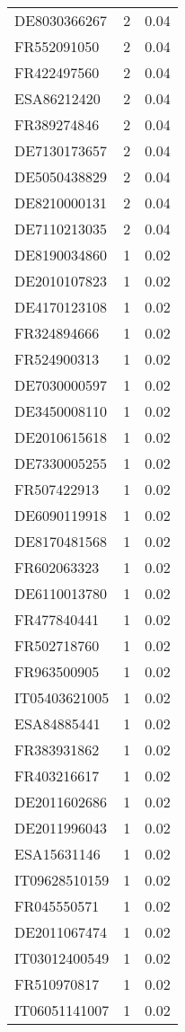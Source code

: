 \begin{table*}[htbp]
\begin{tabular}{lrr}
DE8030366267 & 2 & 0.04 \\
FR552091050 & 2 & 0.04 \\
FR422497560 & 2 & 0.04 \\
ESA86212420 & 2 & 0.04 \\
FR389274846 & 2 & 0.04 \\
DE7130173657 & 2 & 0.04 \\
DE5050438829 & 2 & 0.04 \\
DE8210000131 & 2 & 0.04 \\
DE7110213035 & 2 & 0.04 \\
DE8190034860 & 1 & 0.02 \\
DE2010107823 & 1 & 0.02 \\
DE4170123108 & 1 & 0.02 \\
FR324894666 & 1 & 0.02 \\
FR524900313 & 1 & 0.02 \\
DE7030000597 & 1 & 0.02 \\
DE3450008110 & 1 & 0.02 \\
DE2010615618 & 1 & 0.02 \\
DE7330005255 & 1 & 0.02 \\
FR507422913 & 1 & 0.02 \\
DE6090119918 & 1 & 0.02 \\
DE8170481568 & 1 & 0.02 \\
FR602063323 & 1 & 0.02 \\
DE6110013780 & 1 & 0.02 \\
FR477840441 & 1 & 0.02 \\
FR502718760 & 1 & 0.02 \\
FR963500905 & 1 & 0.02 \\
IT05403621005 & 1 & 0.02 \\
ESA84885441 & 1 & 0.02 \\
FR383931862 & 1 & 0.02 \\
FR403216617 & 1 & 0.02 \\
DE2011602686 & 1 & 0.02 \\
DE2011996043 & 1 & 0.02 \\
ESA15631146 & 1 & 0.02 \\
IT09628510159 & 1 & 0.02 \\
FR045550571 & 1 & 0.02 \\
DE2011067474 & 1 & 0.02 \\
IT03012400549 & 1 & 0.02 \\
FR510970817 & 1 & 0.02 \\
IT06051141007 & 1 & 0.02 \\

\end{tabular}
\end{table*}
